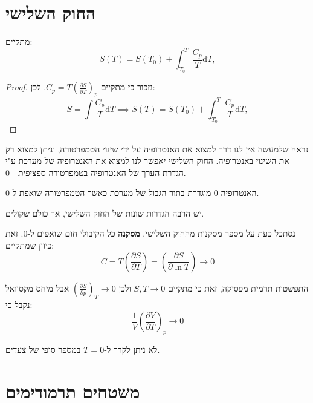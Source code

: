 \documentclass{tstextbook}
\begin{document}
\section{החוק השלישי}

\begin{proposition}
מתקיים:
$$S(T)=S(T_{0})+\int_{T_{0}}^{T}{\frac{C_{p}}{T}}\mathrm{d}T,$$

\end{proposition}
\begin{proof}
נזכור כי מתקיים \(C_{p}=T\left({\frac{\partial S}{\partial T}}\right)_{p}\). לכן:
$$S=\int{\frac{C_{p}}{T}}\mathrm{d}T\implies S(T)=S(T_{0})+\int_{T_{0}}^{T}{\frac{C_{p}}{T}}\mathrm{d}T,$$

\end{proof}
נראה שלמעשה אין לנו דרך למצוא את האנטרופיה על ידי שינוי הטמפרטורה, וניתן למצוא רק את השינוי באנטרופיה. החוק השלישי יאפשר לנו למצוא את האנטרופיה של מערכת ע"י הגדרת הערך של האנטרופיה בטמפרטורה ספציפית - 0.

\begin{theorem}
האנטרופיה 0 מוגדרת בתור הגבול של מערכת כאשר הטמפרטורה שואפת ל-0.

\end{theorem}
\begin{remark}
יש הרבה הגדרות שונות של החוק השלישי, אך כולם שקולים.

\end{remark}
נסתכל כעת על מספר מסקנות מהחוק השלישי.
\textbf{מסקנה}
כל הקיבולי חום שואפים ל-0. זאת כיוון שמתקיים:
$$C=T\left({\frac{\partial S}{\partial T}}\right)=\left({\frac{\partial S}{\partial\ln T}}\right)\rightarrow 0$$

\begin{corollary}
התפשטות תרמית מפסיקה, זאת כי מתקיים \(S,T\to 0\) ולכן \(\left(\frac{\partial S}{\partial p}\right)_{T}\rightarrow0\) אבל מיחס מקסוואל נקבל כי:
$$\frac{1}{V}\left(\frac{\partial V}{\partial T}\right)_{p}\rightarrow0$$

\end{corollary}
\begin{corollary}
לא ניתן לקרר ל-\(T=0\) במספר סופי של צעדים.

\end{corollary}
\section{משטחים תרמודימים}
\end{document}
